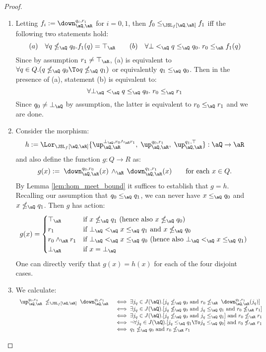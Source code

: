 \documentclass{article}
\begin{document}
\begin{proof}
\begin{enumerate}
\item
Letting $f_i := \down_{\aQ,\aR}^{q_i,r_i}$ for $i = 0,1$, then $f_0 \leq_{\JSL_f[\aQ,\aR]} f_1$ iff the following two statements hold:
\[
(a)\quad\forall q \nleq_\aQ q_0. f_1(q) = \top_\aR
\qquad
(b)\quad\forall \bot <_\aQ q \leq_\aQ q_0. \; r_0 \leq_\aR f_1(q)
\]
Since by assumption $r_1 \neq \top_\aR$, (a) is equivalent to $\forall q \in Q.(q \nleq_\aQ q_0 \To q \nleq_\aQ q_1)$ or equivalently $q_1 \leq_\aQ q_0$. Then in the presence of (a), statement (b) is equivalent to:
\[
\forall \bot_\aQ <_\aQ q \leq_\aQ q_0. \; r_0 \leq_\aQ r_1
\]
Since $q_0 \neq \bot_\aQ$ by assumption, the latter is equivalent to $r_0 \leq_\aQ r_1$ and we are done.

\item
Consider the morphism:
\[
h := \Lor_{\JSL_f[\aQ,\aR]} \{ \up_{\aQ,\aR}^{\bot_\aQ,r_0 \land_\aR r_1}, \;  \up_{\aQ,\aR}^{q_0,r_1}, \; \up_{\aQ,\aR}^{q_1,\top}  \} : \aQ \to \aR
\]
and also define the function $g : Q \to R$ as:
\[
g(x) := \; \down_{\aQ,\aR}^{q_0,r_0}(x) \, \land_\aR \, \down_{\aQ,\aR}^{q_1,r_1}(x)
\qquad
\text{for each $x \in Q$}.
\]
By Lemma \ref{lem:hom_meet_bound} it suffices to establish that $g = h$. Recalling our assumption that $q_0 \leq_\aQ q_1$, we can never have $x \leq_\aQ q_0$ and $x \nleq_\aQ q_1$. Then $g$ has action:
\[
g(x) =
\begin{cases}
\top_\aR & \text{if $x \nleq_\aQ q_1$ (hence also $x \nleq_\aQ q_0$) }
\\
r_1 & \text{if $\bot_\aQ <_\aQ x \leq_\aQ q_1$ and $x \nleq_\aQ q_0$}
\\
r_0 \land_\aR r_1
& \text{if $\bot_\aQ <_\aQ x \leq_\aQ q_0$ (hence also $\bot_\aQ <_\aQ x \leq_\aQ q_1$) }
\\
\bot_\aR & \text{if $x = \bot_\aQ$}
\end{cases}
\]
One can directly verify that $g(x) = h(x)$ for each of the four disjoint cases.

\item
We calculate:
\[
\begin{tabular}{lll}
$\up_{\aQ,\aR}^{q_0,r_0} \; \nleq_{\JSL_f[\aQ,\aR]} \; \down_{\aQ,\aR}^{q_1,r_1}$
&
$\iff \exists j_q \in J(\aQ).[ j_q \nleq_\aQ q_0 \text{ and } r_0 \nleq_\aR \; \down_{\aQ,\aR}^{q_1,r_1}(j_q) ]$
\\&
$\iff \exists j_q \in J(\aQ).[ j_q \nleq_\aQ q_0 \text{ and } j_q \leq_\aQ q_1 \text{ and } r_0 \nleq_\aR r_1 ]$
\\&
$\iff \exists j_q \in J(\aQ).[ j_q \nleq_\aQ q_0 \text{ and } j_q \leq_\aQ q_1 ] \text{ and } r_0 \nleq_\aR r_1$
\\&
$\iff \neg\forall j_q \in J(\aQ).[ j_q \leq_\aQ q_1 \To j_q \leq_\aQ q_0 ]  \text{ and } r_0 \nleq_\aR r_1$
\\&
$\iff q_1 \nleq_\aQ q_0 \text{ and } r_0 \nleq_\aR r_1$
\end{tabular}
\]


\end{enumerate}
\end{proof}
\end{document}
